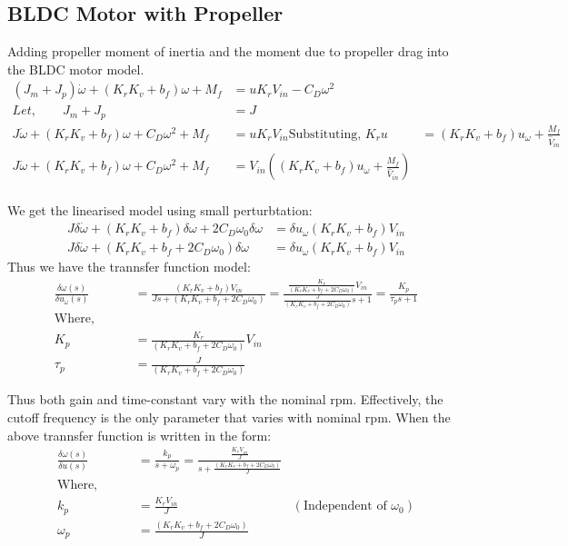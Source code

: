 \subsection{BLDC Motor with Propeller}
Adding propeller moment of inertia and the moment due to propeller drag into the BLDC motor model.
\begin{align*}
    (J_m + J_p) \dot \omega + (K_rK_v + b_f) \omega + M_f &= u K_r V_{in} - C_D \omega^2\\
    Let, \qquad J_m + J_p &= J\\
    J\dot \omega + (K_rK_v + b_f) \omega + C_D \omega^2 + M_f &= u K_r V_{in}
    \text{Substituting, } K_r u &= (K_r K_v  + b_f) u_\omega + \frac{M_f}{\hat V_{in}}\\
    J\dot \omega + (K_rK_v + b_f) \omega + C_D \omega^2 + M_f &= V_{in} \left((K_r K_v  + b_f) u_\omega + \frac{M_f}{\hat V_{in}} \right)\\
\end{align*}


We get the linearised model using small perturbtation:
\begin{align*}
     J \delta \dot \omega + (K_r K_v + b_f) \delta \omega + 2 C_D \omega_0 \delta \omega  &= \delta u_\omega (K_r K_v  + b_f)  V_{in}\\
    J \delta \dot \omega + (K_r K_v + b_f + 2 C_D \omega_0) \delta \omega  &=\delta u_\omega (K_r K_v  + b_f)  V_{in}
\end{align*}
Thus we have the trannsfer function model:
\begin{align*}
    \frac{\delta \omega(s)}{\delta u_\omega (s)} &= \frac{(K_r K_v  + b_f)  V_{in}
}{J s + (K_rK_v + b_f + 2 C_D \omega_0)} = \frac{\frac{K_v}{(K_rK_v + b_f + 2 C_D \omega_0)} V_{in}}{\frac{J}{(K_r K_v + b_f + 2 C_D \omega_0)}s + 1} = \frac{K_p}{\tau_p s + 1}\\
    \text{Where, }\qquad &\\
    K_p &= \frac{K_r}{(K_rK_v + b_f + 2 C_D \omega_0)} V_{in}\\
    \tau_p &= \frac{J}{(K_rK_v + b_f + 2 C_D \omega_0)}
\end{align*}

Thus both gain and time-constant vary with the nominal rpm. Effectively, the cutoff frequency is the only parameter that varies with nominal rpm. When the above trannsfer function is written in the form:
\begin{align*}
    \frac{\delta \omega(s)}{\delta u(s)} &= \frac{k_p}{s + \omega_p} = \frac{\frac{K_r V_{in}}{J}}{s + \frac{(K_rK_v + b_f + 2 C_D \omega_0)}{J}}\\
    \text{Where, } \qquad &\\
    k_p &= \frac{K_r V_{in}}{J} & (\text{Independent of } \omega_0)\\
    \omega_p &= \frac{(K_rK_v + b_f + 2 C_D \omega_0)}{J}
\end{align*}

